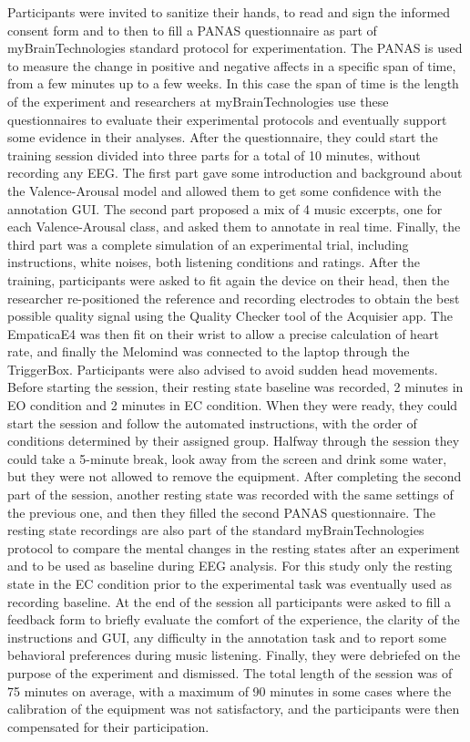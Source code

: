 Participants were invited to sanitize their hands, to read and sign the informed consent form and to then to fill a PANAS questionnaire \cite{watson_development_nodate} as part of myBrainTechnologies standard protocol for experimentation. The PANAS is used to measure the change in positive and negative affects in a specific span of time, from a few minutes up to a few weeks. In this case the span of time is the length of the experiment and researchers at myBrainTechnologies use these questionnaires to evaluate their experimental protocols and eventually support some evidence in their analyses. After the questionnaire, they could start the training session divided into three parts for a total of 10 minutes, without recording any \ac{EEG}. The first part gave some introduction and background about the Valence-Arousal model and allowed them to get some confidence with the annotation GUI. The second part proposed a mix of 4 music excerpts, one for each Valence-Arousal class, and asked them to annotate in real time. Finally, the third part was a complete simulation of an experimental trial, including instructions, white noises, both listening conditions and ratings. After the training, participants were asked to fit again the device on their head, then the researcher re-positioned the reference and recording electrodes to obtain the best possible quality signal using the Quality Checker tool of the Acquisier app. The EmpaticaE4 was then fit on their wrist to allow a precise calculation of heart rate, and finally the Melomind was connected to the laptop through the TriggerBox. Participants were also advised to avoid sudden head movements. Before starting the session, their resting state baseline was recorded, 2 minutes in \ac{EO} condition and 2 minutes in \ac{EC} condition. When they were ready, they could start the session and follow the automated instructions, with the order of conditions determined by their assigned group. Halfway through the session they could take a 5-minute break, look away from the screen and drink some water, but they were not allowed to remove the equipment. After completing the second part of the session, another resting state was recorded with the same settings of the previous one, and then they filled the second PANAS questionnaire. The resting state recordings are also part of the standard myBrainTechnologies protocol to compare the mental changes in the resting states after an experiment and to be used as baseline during \ac{EEG} analysis. For this study only the resting state in the \ac{EC} condition prior to the experimental task was eventually used as recording baseline. At the end of the session all participants were asked to fill a feedback form to briefly evaluate the comfort of the experience, the clarity of the instructions and GUI, any difficulty in the annotation task and to report some behavioral preferences during music listening. Finally, they were debriefed on the purpose of the experiment and dismissed. The total length of the session was of 75 minutes on average, with a maximum of 90 minutes in some cases where the calibration of the equipment was not satisfactory, and the participants were then compensated for their participation.

